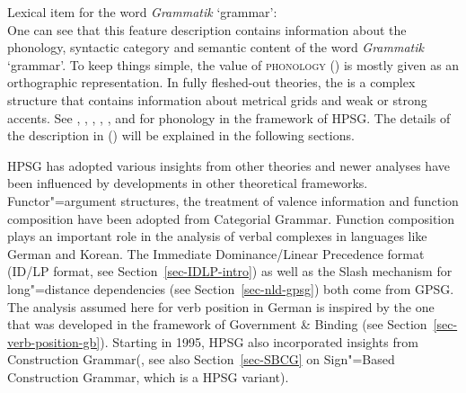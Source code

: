 \ea
Lexical item for the word \emph{Grammatik} `grammar':\\
\z
One can see that this feature description contains information about the phonology, syntactic category and semantic content of the word
\emph{Grammatik} `grammar'. To keep things simple, the value of \textsc{phonology} (\phon) is mostly given as
an orthographic representation. In fully fleshed-out
theories, the \phonv is a complex structure that contains information about metrical grids and weak or strong accents.
See , , , ,
, and  for phonology in the
framework of HPSG. The details of the description in () will be explained in the following sections.

HPSG has adopted various insights from other theories and newer analyses have been influenced by developments in other theoretical frameworks.
Functor"=argument structures, the treatment of valence information and function
composition have been adopted from
Categorial Grammar\indexcg. Function composition plays an important role in the analysis of verbal
complexes in languages like German and Korean. The Immediate Dominance/Linear Precedence format
(ID/LP format, see Section~\ref{sec-IDLP-intro}) as well as the Slash mechanism for long"=distance
dependencies (see Section~\ref{sec-nld-gpsg}) both come from GPSG\indexgpsg. The analysis assumed
here for verb position in German is inspired by the one that was developed in the framework of Government \& Binding\indexgb
(see Section~\ref{sec-verb-position-gb}). Starting in 1995, HPSG also incorporated insights from
Construction Grammar\indexcxg (\citealt{Sag97a}, see also Section~\ref{sec-SBCG} on Sign"=Based Construction Grammar, which is a
HPSG variant).

